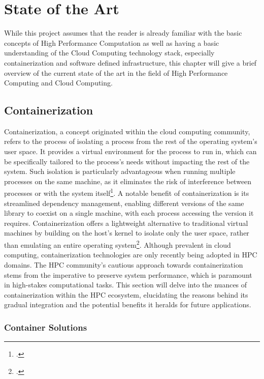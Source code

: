 \chapter{State of the Art}
\label{State_of_the_Art}

While this project assumes that the reader is already familiar with the basic concepts of High Performance Computation
as well as having a basic understanding of the Cloud Computing technology stack, especially containerization and software defined infrastructure,
this chapter will give a brief overview of the current state of the art in the field of High Performance Computing and Cloud Computing.

\section{Containerization}
Containerization, a concept originated within the cloud computing community, refers to the process of
isolating a process from the rest of the operating system's user space. It
provides a virtual environment for the process to run in, which can be
specifically tailored to the process's needs without impacting the rest of the
system. Such isolation is particularly advantageous when running multiple
processes on the same machine, as it eliminates the risk of interference between
processes or with the system itself\footcite{shenoiHPCEducationDomain2019}. A
notable benefit of containerization is its streamlined dependency management,
enabling different versions of the same library to coexist on a single machine,
with each process accessing the version it requires. Containerization offers a
lightweight alternative to traditional virtual machines by building on the
host's kernel to isolate only the user space, rather than emulating an entire
operating system\footcite{WhatContainerDocker}. Although prevalent in cloud
computing, containerization technologies are only recently being adopted in
\ac{HPC} domains. The \ac{HPC} community's cautious approach
towards containerization stems from the imperative to preserve system
performance, which is paramount in high-stakes computational tasks. This section
will delve into the nuances of containerization within the \ac{HPC} ecosystem,
elucidating the reasons behind its gradual integration and the potential
benefits it heralds for future applications.
\subsection*{Container Solutions}

